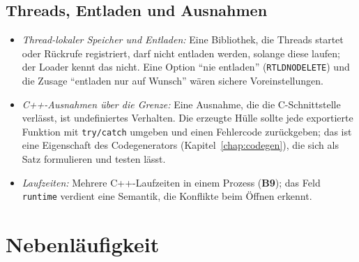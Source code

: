 \documentclass[a4paper,12pt,twoside]{report}
\DeclareRobustCommand{\_}{\ifmmode\mbox{\textunderscore}\else\textunderscore\allowbreak{}\fi}
\theoremstyle{definition}
\newcommand{\Bf}[1]{\textbf{B#1}}
\begin{document}
\subsection{Threads, Entladen und Ausnahmen}
\begin{itemize}
	\item \emph{Thread-lokaler Speicher und Entladen:} Eine Bibliothek, die Threads startet oder Rückrufe registriert, darf nicht entladen werden, solange diese laufen; der Loader kennt das nicht. Eine Option ``nie entladen'' (\texttt{RTLD\_NODELETE}) und die Zusage ``entladen nur auf Wunsch'' wären sichere Voreinstellungen.
	\item \emph{C++-Ausnahmen über die Grenze:} Eine Ausnahme, die die C-Schnittstelle verlässt, ist undefiniertes Verhalten. Die erzeugte Hülle sollte jede exportierte Funktion mit \texttt{try/catch} umgeben und einen Fehlercode zurückgeben; das ist eine Eigenschaft des Codegenerators (Kapitel~\ref{chap:codegen}), die sich als Satz formulieren und testen lässt.
	\item \emph{Laufzeiten:} Mehrere C++-Laufzeiten in einem Prozess (\Bf{9}); das Feld \texttt{runtime} verdient eine Semantik, die Konflikte beim Öffnen erkennt.
\end{itemize}

\section{Nebenläufigkeit}
\label{sec:aus_fein}
\end{document}
